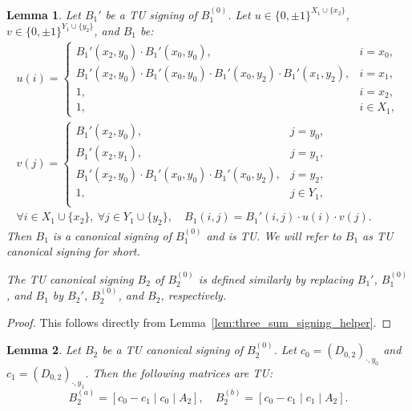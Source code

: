 \documentclass{article}
\newtheorem{lemma}{Lemma}
\theoremstyle{definition}
\begin{document}
\begin{lemma}\label{lem:canonical_signing_construction}
    Let $B_{1}'$ be a TU signing of $B_{1}^{(0)}$. Let $u \in \{0, \pm 1\}^{X_{1} \cup \{x_{2}\}}$, $v \in \{0, \pm 1\}^{Y_{1} \cup \{y_{2}\}}$, and $B_{1}$ be:
    \begin{gather*}
        u(i) = \begin{cases}
            B_{1}' (x_{2}, y_{0}) \cdot B_{1}' (x_{0}, y_{0}), & i = x_{0}, \\
            B_{1}' (x_{2}, y_{0}) \cdot B_{1}' (x_{0}, y_{0}) \cdot B_{1}' (x_{0}, y_{2}) \cdot B_{1}' (x_{1}, y_{2}), & i = x_{1}, \\
            1, & i = x_{2}, \\
            1, & i \in X_{1},
        \end{cases} \\
        v(j) = \begin{cases}
            B_{1}' (x_{2}, y_{0}), & j = y_{0}, \\
            B_{1}' (x_{2}, y_{1}), & j = y_{1}, \\
            B_{1}' (x_{2}, y_{0}) \cdot B_{1}' (x_{0}, y_{0}) \cdot B_{1}' (x_{0}, y_{2}), & j = y_{2}, \\
            1, & j \in Y_{1}, \\
        \end{cases} \\
        \forall i \in X_{1} \cup \{x_{2}\}, \ \forall j \in Y_{1} \cup \{y_{2}\}, \quad B_{1} (i, j) = B_{1}' (i, j) \cdot u(i) \cdot v(j).
    \end{gather*}
    Then $B_{1}$ is a canonical signing of $B_{1}^{(0)}$ and is TU. We will refer to $B_{1}$ as TU canonical signing for short.

    The TU canonical signing $B_{2}$ of $B_{2}^{(0)}$ is defined similarly by replacing $B_{1}'$, $B_{1}^{(0)}$, and $B_{1}$ by $B_{2}'$, $B_{2}^{(0)}$, and $B_{2}$, respectively.
\end{lemma}

\begin{proof}
    This follows directly from Lemma~\ref{lem:three_sum_signing_helper}.
\end{proof}

\begin{lemma}\label{lem:A_2_ext_1_TU}
    Let $B_{2}$ be a TU canonical signing of $B_{2}^{(0)}$. Let $c_{0} = (D_{0, 2})_{\cdot, y_{0}}$ and $c_{1} = (D_{0, 2})_{\cdot, y_{1}}$. Then the following matrices are TU:
    \[
        B_{2}^{(a)} = [c_{0} - c_{1} \mid c_{0} \mid A_{2}], \quad
        B_{2}^{(b)} = [c_{0} - c_{1} \mid c_{1} \mid A_{2}].
    \]
\end{lemma}
\end{document}
